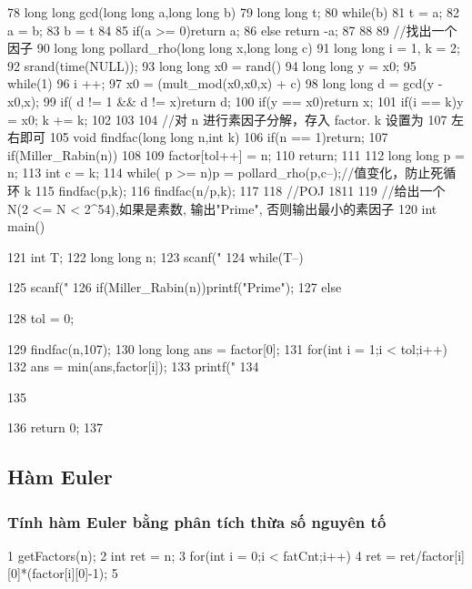 \documentclass[11pt]{article}
\begin{document}
\begin{Code}
 78   long long gcd(long long a,long long b){
 79       long long t;
 80       while(b){
 81           t = a;
 82           a = b;
 83           b = t%
 84       }
 85       if(a >= 0)return a;
 86       else return -a;
 87   }
 88
 89    //找出一个因子
 90   long long pollard_rho(long long x,long long c){
 91        long long i = 1, k = 2;
 92        srand(time(NULL));
 93        long long x0 = rand()%
 94        long long y = x0;
 95        while(1){
 96            i ++;
 97            x0 = (mult_mod(x0,x0,x) + c)%
 98            long long d = gcd(y - x0,x);
 99            if( d != 1 && d != x)return d;
100            if(y == x0)return x;
101            if(i == k){y = x0; k += k;}
102        }
103   }
104     //对 n 进行素因子分解，存入 factor. k 设置为 107 左右即可
105   void findfac(long long n,int k){
106        if(n == 1)return;
107        if(Miller_Rabin(n))
108        {
109            factor[tol++] = n;
110            return;
111        }
112        long long p = n;
113        int c = k;
114        while( p >= n)p = pollard_rho(p,c--);//值变化，防止死循环 k
115        findfac(p,k);
116        findfac(n/p,k);
117   }
118     //POJ 1811
119     //给出一个N(2 <= N < 2^54),如果是素数, 输出"Prime", 否则输出最小的素因子
120   int main(){
121        int T;
122        long long n;
123        scanf("%
124        while(T--){
125            scanf("%
126            if(Miller_Rabin(n))printf("Prime\n");
127            else{
128                tol = 0;


129                findfac(n,107);
130                long long ans = factor[0];
131                for(int i = 1;i < tol;i++)
132                ans = min(ans,factor[i]);
133                printf("%
134            }
135        }
136        return 0;
137 }
\end{Code}

\subsection{Hàm Euler}

\subsubsection{Tính hàm Euler bằng phân tích thừa số nguyên tố}

\begin{Code}
 1   getFactors(n);
 2   int ret = n;
 3   for(int i = 0;i < fatCnt;i++){
 4       ret = ret/factor[i][0]*(factor[i][0]-1);
 5   }
\end{Code}
\end{document}
